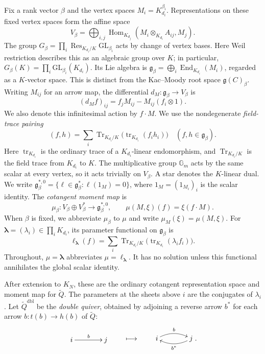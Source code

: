 \documentclass[11pt, reqno]{amsart}
\numberwithin{equation}{section}
\theoremstyle{definition}
\theoremstyle{remark}
\newcommand{\op}[1]{\operatorname{#1}}
\newcommand{\mr}[1]{\mathrm{#1}}
\newcommand{\mb}[1]{\mathbb{#1}}
\newcommand{\End}{\op{End}}
\newcommand{\Hom}{\op{Hom}}
\newcommand{\Tr}{\op{Tr}}
\newcommand{\Res}{\op{Res}}
\newcommand{\Qbar}{\widetilde Q}
\newcommand{\quiverdiagram}[1]{\vcenter{\hbox{$\displaystyle #1$}}}
\begin{document}
Fix a rank vector $\beta$ and the vertex spaces
$M_i=K_{d_i}^{\beta_i}$. Representations on these fixed vertex spaces form the affine space
\[ V_\beta=\bigoplus_{i,j} \Hom_{K_{d_j}}(M_i\otimes_{K_{d_i}}A_{ij},M_j). \]
The group $G_\beta=\prod_i\Res_{K_{d_i}/K}\mr{GL}_{\beta_i}$
acts by change of vertex bases. Here Weil restriction describes this
as an algebraic group over $K$; in particular,
$G_\beta(K)=\prod_i\mr{GL}_{\beta_i}(K_{d_i})$.
Its Lie algebra is
$\mathfrak g_\beta=\bigoplus_i\End_{K_{d_i}}(M_i)$, regarded as a
$K$-vector space. This is distinct from the Kac--Moody root space
$\mathfrak g(C)_\beta$. Writing $M_{ij}$ for an arrow map, the
differential $d_M:\mathfrak g_\beta\to V_\beta$ is
\[ (d_Mf)_{ij}=f_jM_{ij}-M_{ij}(f_i\otimes1). \]
We also denote this infinitesimal action by $f\cdot M$.
We use the nondegenerate \emph{field-trace pairing}
\[ (f,h)=\sum_i\Tr_{K_{d_i}/K} \bigl(\op{tr}_{K_{d_i}}(f_i h_i)\bigr) \quad(f,h\in\mathfrak g_\beta). \]
Here $\op{tr}_{K_{d_i}}$ is the ordinary trace of a
$K_{d_i}$-linear endomorphism, and $\Tr_{K_{d_i}/K}$ is the field
trace from $K_{d_i}$ to $K$.
The multiplicative group $\mb G_m$ acts by the same scalar at
every vertex, so it acts trivially on $V_\beta$. A star denotes the
$K$-linear dual. We write
$\mathfrak g_\beta^{*,0}=\{\ell\in\mathfrak g_\beta^*:\ell(1_M)=0\}$,
where $1_M=(1_{M_i})_i$ is the scalar identity.
The \emph{cotangent moment map} is
\[ \mu_\beta:V_\beta\oplus V_\beta^*\longrightarrow\mathfrak g_\beta^{*,0}, \qquad \mu(M,\xi)(f)=\xi(f\cdot M). \]
When $\beta$ is fixed, we abbreviate $\mu_\beta$ to $\mu$ and write
$\mu_M(\xi)=\mu(M,\xi)$.
For $\boldsymbol\lambda=(\lambda_i)\in\prod_iK_{d_i}$, its
parameter functional on $\mathfrak g_\beta$ is
\[ \ell_{\boldsymbol\lambda}(f)= \sum_i\Tr_{K_{d_i}/K} \bigl(\op{tr}_{K_{d_i}}(\lambda_i f_i)\bigr). \]
Throughout, $\mu=\boldsymbol\lambda$ abbreviates
$\mu=\ell_{\boldsymbol\lambda}$.
It has no solution unless this functional annihilates the global
scalar identity.

After extension to $K_N$, these are the ordinary cotangent
representation space and moment map for $\Qbar$. The parameters at
the sheets above $i$ are the conjugates of $\lambda_i$.
Let $\Qbar^{\mr{dbl}}$ be the \emph{double quiver}, obtained by
adjoining a reverse arrow $b^*$ for each arrow
$b:t(b)\to h(b)$ of $\Qbar$:
\[ \quiverdiagram{\xymatrix@C=3.8em{i\ar[r]^{b}&j}}\qquad\longmapsto\qquad
\quiverdiagram{\xymatrix@C=3.8em{i\ar@/^0.6pc/[r]^{b}&j\ar@/^0.6pc/[l]^{b^*}}}. \]
\end{document}
